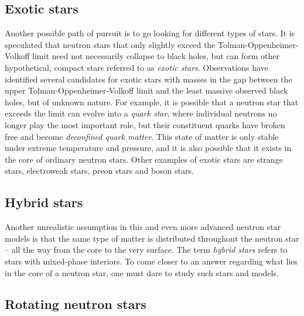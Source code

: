 \subsection*{Exotic stars}

Another possible path of pursuit is to go looking for different types of stars.
It is speculated that neutron stars that only slightly exceed the Tolman-Oppenheimer-Volkoff limit need not necessarily collapse to black holes, but can form other hypothetical, compact stars referred to as \emph{exotic stars}.
Observations have identified several candidates for exotic stars with masses in the gap between the upper Tolman-Oppenheimer-Volkoff limit and the least massive observed black holes, but of unknown nature. \cite{ref:wiki_list_star_massess}
For example, it is possible that a neutron star that exceeds the limit can evolve into a \emph{quark star}, where individual neutrons no longer play the most important role, but their constituent quarks have broken free and become \emph{deconfined quark matter}.
This state of matter is only stable under extreme temperature and pressure, and it is also possible that it exists in the core of ordinary neutron stars. \cite[chapter 8]{ref:glendenning}
Other examples of exotic stars are strange stars, electroweak stars, preon stars and boson stars.

\subsection*{Hybrid stars}

Another unrealistic assumption in this and even more advanced neutron star models is that the same type of matter is distributed throughout the neutron star -- all the way from the core to the very surface.
The term \emph{hybrid stars} refers to stars with mixed-phase interiors. \cite[chapter 9]{ref:glendenning}
To come closer to an answer regarding what lies in the core of a neutron star, one must dare to study such stars and models.

\subsection*{Rotating neutron stars}

